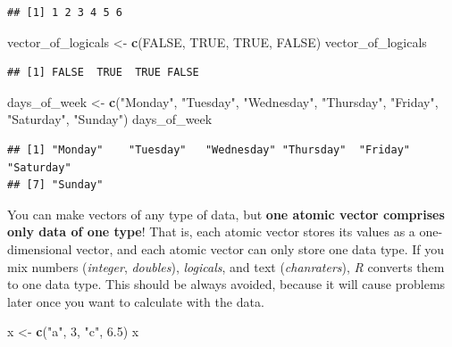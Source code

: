 \documentclass[
]{scrartcl}
\newenvironment{Shaded}{\begin{snugshade}}{\end{snugshade}}
\newcommand{\ConstantTok}[1]{\textcolor[rgb]{0.56,0.35,0.01}{#1}}
\newcommand{\DecValTok}[1]{\textcolor[rgb]{0.00,0.00,0.81}{#1}}
\newcommand{\FloatTok}[1]{\textcolor[rgb]{0.00,0.00,0.81}{#1}}
\newcommand{\FunctionTok}[1]{\textcolor[rgb]{0.13,0.29,0.53}{\textbf{#1}}}
\newcommand{\NormalTok}[1]{#1}
\newcommand{\OtherTok}[1]{\textcolor[rgb]{0.56,0.35,0.01}{#1}}
\newcommand{\StringTok}[1]{\textcolor[rgb]{0.31,0.60,0.02}{#1}}
\begin{document}
\begin{verbatim}
## [1] 1 2 3 4 5 6
\end{verbatim}

\begin{Shaded}
\begin{Highlighting}[]
\NormalTok{vector\_of\_logicals  }\OtherTok{\textless{}{-}} \FunctionTok{c}\NormalTok{(}\ConstantTok{FALSE}\NormalTok{, }\ConstantTok{TRUE}\NormalTok{, }\ConstantTok{TRUE}\NormalTok{, }\ConstantTok{FALSE}\NormalTok{)}
\NormalTok{vector\_of\_logicals}
\end{Highlighting}
\end{Shaded}

\begin{verbatim}
## [1] FALSE  TRUE  TRUE FALSE
\end{verbatim}

\begin{Shaded}
\begin{Highlighting}[]
\NormalTok{days\_of\_week }\OtherTok{\textless{}{-}} \FunctionTok{c}\NormalTok{(}\StringTok{"Monday"}\NormalTok{, }\StringTok{"Tuesday"}\NormalTok{, }\StringTok{"Wednesday"}\NormalTok{, }\StringTok{"Thursday"}\NormalTok{, }\StringTok{"Friday"}\NormalTok{,}
                \StringTok{"Saturday"}\NormalTok{, }\StringTok{"Sunday"}\NormalTok{)}
\NormalTok{days\_of\_week}
\end{Highlighting}
\end{Shaded}

\begin{verbatim}
## [1] "Monday"    "Tuesday"   "Wednesday" "Thursday"  "Friday"    "Saturday" 
## [7] "Sunday"
\end{verbatim}

You can make vectors of any type of data, but \textbf{one atomic vector comprises only data of one type}! That is, each atomic vector stores its values as a one-dimensional vector, and each atomic vector can only store one data type. If you mix numbers (\emph{integer}, \emph{doubles}), \emph{logicals}, and text (\emph{chanraters}), \emph{R} converts them to one data type. This should be always avoided, because it will cause problems later once you want to calculate with the data.

\begin{Shaded}
\begin{Highlighting}[]
\NormalTok{x }\OtherTok{\textless{}{-}} \FunctionTok{c}\NormalTok{(}\StringTok{"a"}\NormalTok{, }\DecValTok{3}\NormalTok{, }\StringTok{"c"}\NormalTok{, }\FloatTok{6.5}\NormalTok{)}
\NormalTok{x}
\end{Highlighting}
\end{Shaded}
\end{document}
